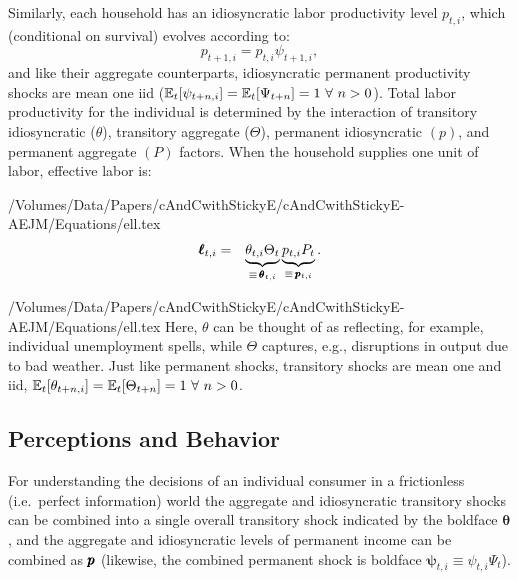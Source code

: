 Similarly, each household has an idiosyncratic labor productivity level $p_{t,i}$, which (conditional on survival) evolves according to:
\begin{equation}
p_{t+1,i} = p_{t,i} \psi_{t+1,i},  \label{eq:IndRandWalk}
\end{equation}
and like their aggregate counterparts, idiosyncratic permanent productivity shocks are mean
one iid ($\operatorname{\mathbb{E}}_{t}[\psi_{t+n,i}]=\operatorname{\mathbb{E}}_{t}[\Psi_{t+n}]= 1~\forall ~n>0$).
Total labor productivity for the individual is determined by the interaction of transitory idiosyncratic
($\theta$), transitory aggregate ($\Theta$), permanent idiosyncratic $({p})$, and permanent aggregate
$({P})$ factors.  When the household supplies one unit of labor, effective labor is:
\begin{verbatimwrite}{/Volumes/Data/Papers/cAndCwithStickyE/cAndCwithStickyE-AEJM/Equations/ell.tex}
\newcommand{\TranShocktpOne }{\Theta_{t}}
\begin{eqnarray}
  \label{eq:ell}
   \pmb{\ell}_{t,i} & = & \underbrace{\theta_{t,i}\TranShocktpOne}_{\equiv\,\pmb{\theta}_{t,i}}\underbrace{{p}_{t,i} {P}_{t}}_{\equiv\,\pLev_{t,i}}.
\end{eqnarray}
\end{verbatimwrite}
 {/Volumes/Data/Papers/cAndCwithStickyE/cAndCwithStickyE-AEJM/Equations/ell.tex} Here, $\theta$ can be thought of as reflecting, for example, individual unemployment spells, while $\Theta$ captures, e.g., disruptions in output due to bad weather.  Just like permanent shocks, transitory shocks are mean one and iid, $\operatorname{\mathbb{E}}_{t}[\theta_{t+n,i}]=\operatorname{\mathbb{E}}_{t}[\Theta_{t+n}]=1~\forall~n>0$.  


\subsection{Perceptions and Behavior}

For understanding the decisions of an individual consumer in a frictionless (i.e.\ perfect information) world the aggregate and idiosyncratic transitory shocks can be combined into a single overall transitory shock indicated by the boldface $\pmb{\theta}$, and the aggregate and idiosyncratic levels of permanent income can be combined as $\pmb{p}$ (likewise, the combined permanent shock is boldface $\pmb{\psi}_{t,i}\equiv \psi_{t,i} \Psi_{t}$).


